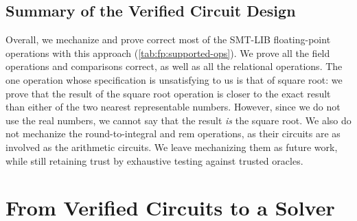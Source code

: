 \subsection{Summary of the Verified Circuit Design}

Overall, we mechanize and prove correct most of the SMT-LIB floating-point operations
with this approach (\cref{tab:fp:supported-ops}).
We prove all the field operations and comparisons correct,
as well as all the relational operations.
The one operation whose specification is unsatisfying to us is that of square root:
we prove that the result of the square root operation is closer to the exact result than either of the two nearest representable numbers.
However, since we do not use the real numbers, we cannot say that the result \emph{is} the square root.
We also do not mechanize the round-to-integral and rem operations,
as their circuits are as involved as the arithmetic circuits.
We leave mechanizing them as future work, while still retaining trust by exhaustive testing against trusted oracles.


\section{From Verified Circuits to a Solver}
\label{sec:fp:solver}


